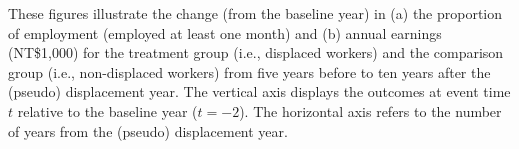\vspace{-3em}
\begin{singlespace}
        \begin{footnotesize}
        		 These figures illustrate the change (from the baseline year) in (a) the proportion of employment (employed at least one month) and (b) annual earnings (NT\$1,000) for the treatment group (i.e., displaced workers) and the comparison group (i.e., non-displaced workers) from five years before to ten years after the (pseudo) displacement year. The vertical axis displays the outcomes at event time $t$ relative to the baseline year ($t = -2$). The horizontal axis refers to the number of years from the (pseudo) displacement year.
        \end{footnotesize}
\end{singlespace}






